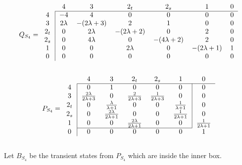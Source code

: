 \documentclass{article}
\theoremstyle{plain}
\theoremstyle{definition}
\theoremstyle{remark}
\numberwithin{equation}{section}
\begin{document}
\begin{equation}
Q_{S_4} = 
\begin{blockarray}{ccccccc}
    & 4 & 3 & 2_t & 2_s & 1 & 0\\
    \begin{block}{c|cccccc}
    \cline{2-7}
    4 & -4 & 4 & 0 & 0 & 0 & 0\\
    3 & 2\lambda & -(2\lambda + 3) & 2 & 1 & 0 & 0\\
    2_t & 0 & 2\lambda & -(2\lambda + 2) & 0 & 2 & 0\\
    2_s & 0 & 4\lambda & 0 & -(4\lambda + 2) & 2 & 0\\
    1 & 0 & 0 & 2\lambda & 0 & -(2\lambda + 1) & 1\\
    0 & 0 & 0 & 0 & 0 & 0 & 0\\
    \end{block}
\end{blockarray}
\end{equation}

\begingroup
\renewcommand*{\arraystretch}{2}
\begin{equation}
P_{S_4} = 
\begin{blockarray}{ccccccc}
    & 4 & 3 & 2_t & 2_s & 1 & 0\\
    \begin{block}{c|ccccc|c}
    \cline{2-7}
    4 & 0 & 1 & 0 & 0 & 0 & 0\\
    3 & \frac{2\lambda}{2\lambda + 3} & 0 & \frac{2}{2\lambda + 3} & \frac{1}{2\lambda + 3} & 0 & 0\\
    2_t & 0 & \frac{\lambda}{\lambda + 1} & 0 & 0 & \frac{1}{\lambda + 1} & 0\\
    2_s & 0 & \frac{2\lambda}{2\lambda + 1} & 0 & 0 & \frac{1}{2\lambda + 1} & 0\\
    1 & 0 & 0 & \frac{2\lambda}{2\lambda + 1} & 0 & 0 & \frac{1}{2\lambda + 1}\\
    \cline{2-6}
    \end{block}
    \begin{block}{c|cccccc}
    0 & 0 & 0 & 0 & 0 & 0 & 1\\
    \end{block}
\end{blockarray}
\end{equation}

Let $B_{S_4}$ be the transient states from $P_{S_4}$ which are inside the inner box.
\end{document}
